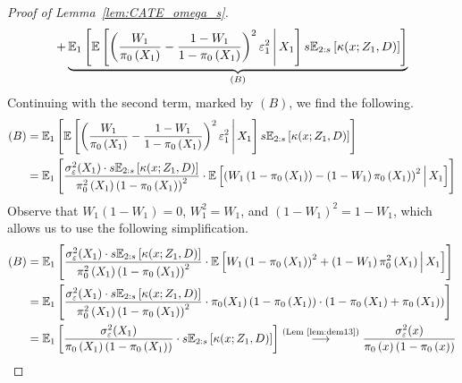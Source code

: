 \begin{proof}[Proof of Lemma~\ref{lem:CATE_omega_s}]
\begin{equation}
\begin{aligned}
			+ \underbrace{\mathbb{E}_{1}\left[\mathbb{E}\left[\left(\frac{W_{1}}{\pi_{0}\left(X_1\right)} - \frac{1 - W_{1}}{1 - \pi_{0}\left(X_1\right)}\right)^2 \varepsilon_{1}^2 \, \middle| \, X_1\right] s \mathbb{E}_{2:s}\left[\kappa(x; Z_1, D)\right]\right]}_{(B)}
		\end{aligned}
	\end{equation}
	Continuing with the second term, marked by $(B)$, we find the following.
	\begin{equation}
		\begin{aligned}
			(B)
			& = \mathbb{E}_{1}\left[\mathbb{E}\left[\left(\frac{W_{1}}{\pi_{0}\left(X_1\right)} - \frac{1 - W_{1}}{1 - \pi_{0}\left(X_1\right)}\right)^2 \varepsilon_{1}^2 \, \middle| \, X_1\right] s \mathbb{E}_{2:s}\left[\kappa(x; Z_1, D)\right]\right] \\
			& = \mathbb{E}_{1}\left[\frac{\sigma_{\varepsilon}^2(X_1) \cdot s \mathbb{E}_{2:s}\left[\kappa(x; Z_1, D)\right]}{\pi_{0}^2\left(X_1\right)\left(1 - \pi_{0}\left(X_1\right)\right)^2} \cdot
			\mathbb{E}\left[\left(W_{1}\left(1 - \pi_{0}\left(X_1\right)\right) - \left(1 - W_{1}\right)\pi_{0}\left(X_1\right)\right)^2 \, \middle| \, X_1\right] \right]                                                                    \\
		\end{aligned}
	\end{equation}
	Observe that $W_1(1-W_1) = 0$, $W_1^2 = W_1$, and $(1-W_1)^2 = 1 - W_1$, which allows us to use the following simplification.
	\begin{equation}
		\begin{aligned}
			(B)
			& = \E_{1}\left[\frac{\sigma_{\varepsilon}^2(X_1) \cdot s \E_{2:s}\left[\kappa(x; Z_1, D)\right]}{\pi_{0}^2\left(X_1\right)\left(1 - \pi_{0}\left(X_1\right)\right)^2} \cdot
			\E\left[W_{1}\left(1 - \pi_{0}\left(X_1\right)\right)^2 + \left(1 - W_{1}\right)\pi_{0}^2\left(X_1\right) \, \middle| \, X_1\right] \right]\\
			& = \E_{1}\left[\frac{\sigma_{\varepsilon}^2(X_1) \cdot s \E_{2:s}\left[\kappa(x; Z_1, D)\right]}{\pi_{0}^2\left(X_1\right)\left(1 - \pi_{0}\left(X_1\right)\right)^2} \cdot \pi_{0}(X_1)\left(1 - \pi_{0}\left(X_1\right)\right) \cdot
			\left(1 - \pi_{0}\left(X_1\right) + \pi_{0}\left(X_1\right)\right)\right]\\
			& = \E_{1}\left[\frac{\sigma_{\varepsilon}^2(X_1) }{\pi_{0}\left(X_1\right)\left(1 - \pi_{0}\left(X_1\right)\right)}\cdot s \E_{2:s}\left[\kappa(x; Z_1, D)\right]\right]
			\overset{\text{(Lem~\ref{lem:dem13})}}{\longrightarrow} \frac{\sigma_{\varepsilon}^2(x)}{\pi_{0}\left(x\right)\left(1 - \pi_{0}\left(x\right)\right)}

\end{aligned}
\end{equation}
\end{proof}
